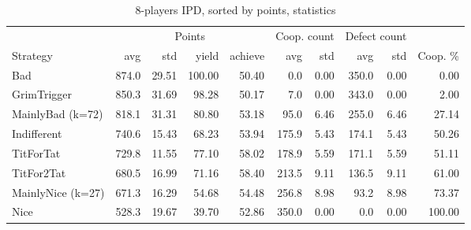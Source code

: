 \documentclass[journal,a4paper,10pt,twoside]{IEEEtran} %
\begin{document}
\begin{table}[ht]
   	\caption{8-players IPD, sorted by points, statistics}
   	\label{tab:ipdmp8}
   	\centering
    \begin{tabular}{l|rrrr|rrrrr} \toprule
    	                  & \multicolumn{4}{c}{Points}           & \multicolumn{2}{c}{Coop. count} & \multicolumn{2}{c}{Defect count} &        \\
    	Strategy          &   avg &   std &      yield & achieve &   avg &                     std &   avg &                      std & Coop. \% \\ \midrule
    	Bad               & 874.0 & 29.51 &     100.00 &   50.40 &   0.0 &                    0.00 & 350.0 &                     0.00 &   0.00 \\
    	GrimTrigger       & 850.3 & 31.69 &      98.28 &   50.17 &   7.0 &                    0.00 & 343.0 &                     0.00 &   2.00 \\
    	MainlyBad (k=72)  & 818.1 & 31.31 &      80.80 &   53.18 &  95.0 &                    6.46 & 255.0 &                     6.46 &  27.14 \\
    	Indifferent       & 740.6 & 15.43 &      68.23 &   53.94 & 175.9 &                    5.43 & 174.1 &                     5.43 &  50.26 \\
    	TitForTat         & 729.8 & 11.55 &      77.10 &   58.02 & 178.9 &                    5.59 & 171.1 &                     5.59 &  51.11 \\
    	TitFor2Tat        & 680.5 & 16.99 &      71.16 &   58.40 & 213.5 &                    9.11 & 136.5 &                     9.11 &  61.00 \\
    	MainlyNice (k=27) & 671.3 & 16.29 &      54.68 &   54.48 & 256.8 &                    8.98 &  93.2 &                     8.98 &  73.37 \\
    	Nice              & 528.3 & 19.67 &      39.70 &   52.86 & 350.0 &                    0.00 &   0.0 &                     0.00 & 100.00 \\ \bottomrule
    \end{tabular}
\end{table}
\end{document}
